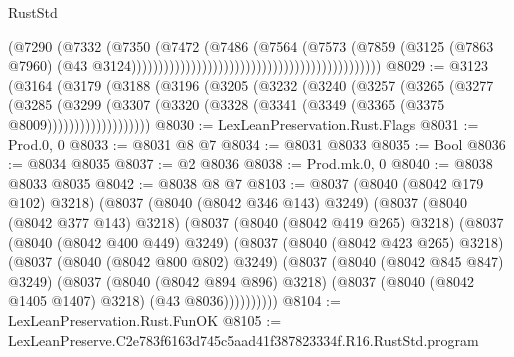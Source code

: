\begin{lexlean}{RustStd}
\begin{coremodule}
                                                                            (@7290
                                                                              (@7332
                                                                                (@7350
                                                                                  (@7472
                                                                                    (@7486
                                                                                      (@7564
                                                                                        (@7573
                                                                                          (@7859
                                                                                            (@3125
                                                                                              (@7863
                                                                                                @7960)
                                                                                              (@43
                                                                                                @3124))))))))))))))))))))))))))))))))))))))))))))))
@8029 := @3123
    (@3164
      (@3179
        (@3188
          (@3196
            (@3205
              (@3232
                (@3240
                  (@3257
                    (@3265
                      (@3277
                        (@3285
                          (@3299
                            (@3307
                              (@3320 (@3328 (@3341 (@3349 (@3365 (@3375 @8009)))))))))))))))))))
@8030 := LexLeanPreservation.Rust.Flags
@8031 := Prod.{0, 0}
@8033 := @8031 @8 @7
@8034 := @8031 @8033
@8035 := Bool
@8036 := @8034 @8035
@8037 := @2 @8036
@8038 := Prod.mk.{0, 0}
@8040 := @8038 @8033 @8035
@8042 := @8038 @8 @7
@8103 := @8037
    (@8040 (@8042 @179 @102) @3218)
    (@8037
      (@8040 (@8042 @346 @143) @3249)
      (@8037
        (@8040 (@8042 @377 @143) @3218)
        (@8037
          (@8040 (@8042 @419 @265) @3218)
          (@8037
            (@8040 (@8042 @400 @449) @3249)
            (@8037
              (@8040 (@8042 @423 @265) @3218)
              (@8037
                (@8040 (@8042 @800 @802) @3249)
                (@8037
                  (@8040 (@8042 @845 @847) @3249)
                  (@8037
                    (@8040 (@8042 @894 @896) @3218)
                    (@8037 (@8040 (@8042 @1405 @1407) @3218) (@43 @8036))))))))))
@8104 := LexLeanPreservation.Rust.FunOK
@8105 := LexLeanPreserve.C2e783f6163d745c5aad41f387823334f.R16.RustStd.program

\end{coremodule}
\end{lexlean}
